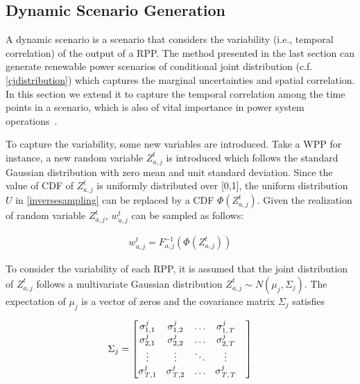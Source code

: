 \subsection {Dynamic Scenario Generation}
{A dynamic scenario is a scenario that considers the variability (i.e., temporal correlation) of the output of a RPP.} The method presented in the last section can generate renewable power scenarios of conditional joint distribution (c.f. \eqref{cjdistribution}) which captures the marginal uncertainties and spatial correlation. In this section we extend it to capture the temporal correlation among the time points in a scenario, which is also of vital importance in power system operations~\cite{sce_generation_Ma,PCA,sce_generation_Pinson}.

To capture the variability, some new variables are introduced. Take a WPP for instance, a new random variable $Z_{a,j}^{t}$ is introduced which follows
the standard Gaussian distribution with zero mean and unit standard deviation. Since the value of CDF of $Z_{a,j}^{t}$ is uniformly distributed over [0,1], the uniform distribution $U$ in \eqref{inversesampling} can be replaced by a CDF $\Phi(Z_{a,j}^{t})$.  Given the realization of random variable $Z_{a,j}^{t}$, $w_{a,j}^{t}$ can be sampled as follows:



\begin{equation} \label{transform}
\begin{aligned}
w_{a,j}^t=F_{a,j}^{-1}(\Phi(Z_{a,j}^{t}))
\end{aligned}
\end{equation}

To consider the variability of each RPP, it is assumed that the joint distribution of $Z_{a,j}^{t}$ follows a multivariate Gaussian distribution $Z_{a,j}^{t} \sim N(\mu_{j},\Sigma_{j})$. The expectation of $\mu_{j}$ is a vector of zeros and the covariance matrix $\Sigma_{j}$ satisfies


\begin{equation} \label{matrix}
\Sigma_j=\left[
\begin{matrix}
\sigma_{1,1}^{j}&\sigma_{1,2}^{j}&\dots&\sigma_{1,{\it T}}^{j}&\\
\sigma_{2,1}^{j}&\sigma_{2,2}^{j}&\dots&\sigma_{2,{\it T}}^{j}&\\
\vdots&\vdots&\ddots&\vdots&\\
\sigma_{{\it T},1}^{j}&\sigma_{{\it T},2}^{j}&\dots&\sigma_{{\it T},{\it T}}^{j}&\\
\end{matrix}
\right]
\end{equation}


